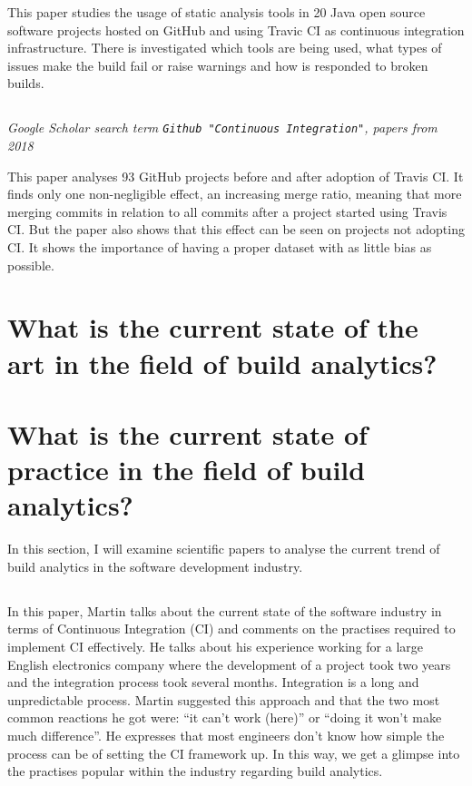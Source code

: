 \documentclass[]{book}
\begin{document}
This paper studies the usage of static analysis tools in 20 Java open
source software projects hosted on GitHub and using Travic CI as
continuous integration infrastructure. There is investigated which tools
are being used, what types of issues make the build fail or raise
warnings and how is responded to broken builds.

\subsection{\texorpdfstring{\citet{baltes2018no}}{@baltes2018no}}\label{baltes2018no}

\emph{Google Scholar search term
\texttt{Github\ "Continuous\ Integration"}, papers from 2018}

This paper analyses 93 GitHub projects before and after adoption of
Travis CI. It finds only one non-negligible effect, an increasing merge
ratio, meaning that more merging commits in relation to all commits
after a project started using Travis CI. But the paper also shows that
this effect can be seen on projects not adopting CI. It shows the
importance of having a proper dataset with as little bias as possible.

\section{What is the current state of the art in the field of build
analytics?}\label{what-is-the-current-state-of-the-art-in-the-field-of-build-analytics}

\section{What is the current state of practice in the field of build
analytics?}\label{what-is-the-current-state-of-practice-in-the-field-of-build-analytics}

In this section, I will examine scientific papers to analyse the current
trend of build analytics in the software development industry.

\subsection{\texorpdfstring{\citet{fowler2006continuous}}{@fowler2006continuous}}\label{fowler2006continuous}

In this paper, Martin talks about the current state of the software
industry in terms of Continuous Integration (CI) and comments on the
practises required to implement CI effectively. He talks about his
experience working for a large English electronics company where the
development of a project took two years and the integration process took
several months. Integration is a long and unpredictable process. Martin
suggested this approach and that the two most common reactions he got
were: ``it can't work (here)'' or ``doing it won't make much
difference''. He expresses that most engineers don't know how simple the
process can be of setting the CI framework up. In this way, we get a
glimpse into the practises popular within the industry regarding build
analytics.
\end{document}
